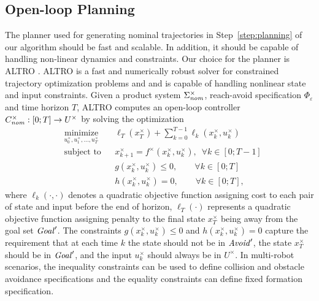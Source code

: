

\subsection{Open-loop Planning}
The planner used for generating nominal trajectories in Step~\ref{step:planning} of our algorithm should be fast and scalable. In addition, it should be capable of handling non-linear dynamics and constraints. Our choice for the planner is ALTRO \cite{howell2019altro}. ALTRO is a fast and numerically robust solver for constrained trajectory optimization problems and and is capable of handling nonlinear state and input constraints. Given a product system $\Sigma_{\mathit{nom}}^\times$, reach-avoid specification $\Phi_\varepsilon$ and time horizon $T$, ALTRO computes an open-loop controller $C^\times_{\mathit{nom}}:[0;T]\rightarrow U^\times$ by solving the optimization
\begin{equation*}
	\begin{aligned}
		& \underset{u^\times_0,u^\times_1,\ldots,u^\times_T}{\text{minimize}}
		& & \ell_T(x^\times_T)+\sum_{k=0}^{T-1}\ell_k(x^\times_k,u^\times_k) \\
		& \text{subject to}
		& & x^\times_{k+1}=f^\times(x^\times_k,u^\times_k),\,\,\,\forall k\in[0;T-1]\\
		& & &  g(x^\times_k,u^\times_k)\leq 0, \qquad\forall k\in[0;T]\\
		& & &  h(x^\times_k,u^\times_k)=0,\qquad\forall k\in[0;T],
	\end{aligned}
\end{equation*}
where $\ell_k(\cdot,\cdot)$ denotes a quadratic objective function assigning cost to each pair of state and input before the end of horizon, $\ell_T(\cdot)$ represents a quadratic objective function assigning penalty to the final state $x^\times_T$ being away from the goal set $\mathit{Goal}'$. The constraints $g(x^\times_k,u^\times_k)\leq 0$ and $h(x^\times_k,u^\times_k)=0$ capture the requirement that at each time $k$ the state should not be in $\mathit{Avoid}'$, the state $x^\times_T$ should be in $\mathit{Goal}'$, and the input $u^\times_k$ should always be in $U^\times$.
%
In multi-robot scenarios, the inequality constraints can be used to define collision and obstacle avoidance specifications and the equality constraints can define fixed formation specification.

